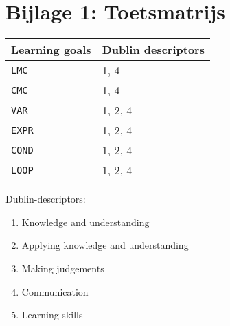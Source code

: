 \section*{Bijlage 1: Toetsmatrijs}
	\begin{tabular}{|p{1cm}|p{4cm}|}
		\hline
		Learning goals & Dublin descriptors \\
		\hline
		\texttt{LMC} & 1, 4 \\
		\hline
		\texttt{CMC} & 1, 4 \\
		\hline
		\texttt{VAR} & 1, 2, 4 \\
		\hline
		\texttt{EXPR} & 1, 2, 4 \\
		\hline
		\texttt{COND} & 1, 2, 4 \\
		\hline
		\texttt{LOOP} & 1, 2, 4 \\
		\hline
	\end{tabular}
	
	\vspace{1cm}

	Dublin-descriptors:
	\begin{enumerate}
		\item Knowledge and understanding
		\item Applying knowledge and understanding
		\item Making judgements
		\item Communication
		\item Learning skills
	\end{enumerate}
